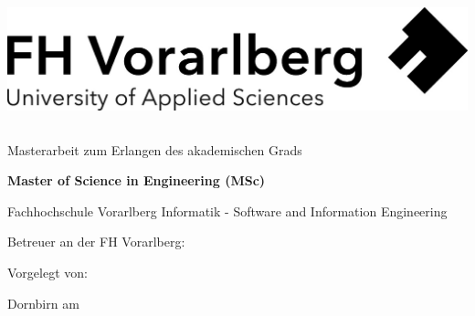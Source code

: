\raggedbottom
\cleardoublepage   %
\setcounter{tocdepth}{3}
\thispagestyle{empty}
\begin{titlepage}
  \begin{flushright}
  \includegraphics[width=0.4\linewidth]{_other/titlepage/Logo-A3.jpg}
  \end{flushright}
  \begin{flushleft}
  \section*{\papertitle}
  \subsection*{\papersubtitle}
  \vspace{1cm}
  
  \vspace{0.5cm}
  Masterarbeit\newline
  zum Erlangen des akademischen Grads\newline

  \vspace{0.5cm}
  \textbf{Master of Science in Engineering (MSc)}

  \vspace{1cm}
  Fachhochschule Vorarlberg \newline
  Informatik - Software and Information Engineering
  \newline
  \papercourse

 

  
  
  \vspace{0.5cm}
  Betreuer an der FH Vorarlberg:\newline
  \phantom{x}\hspace{3ex}\papersupervisor
  
  \vspace{0.5cm}
  
  Vorgelegt von: \newline
  \phantom{x}\hspace{3ex}\paperauthor
  \end{flushleft}
   \vspace{0.5cm}
 Dornbirn am \paperdate
\end{titlepage}

\clearpage